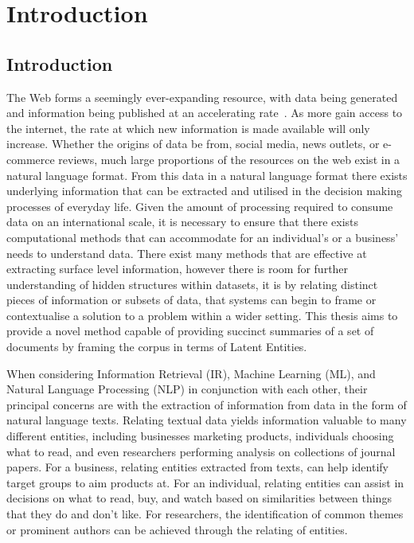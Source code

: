 \documentclass[10pt]{report}
\begin{document}
\renewcommand{\baselinestretch}{0.5}\normalsize
\tableofcontents
\listoffigures
\listoftables
\renewcommand{\baselinestretch}{2.0}\normalsize

%
%
%
%

\chapter{Introduction}

\section{Introduction}
The Web forms a seemingly ever-expanding resource, with data being generated and information being published at an accelerating rate~\cite{WebServer-lc}. As more gain access to the internet, the rate at which new information is made available will only increase. Whether the origins of data be from, social media, news outlets, or e-commerce reviews, much large proportions of the resources on the web exist in a natural language format. From this data in a natural language format there exists underlying information that can be extracted and utilised in the decision making processes of everyday life. Given the amount of processing required to consume data on an international scale, it is necessary to ensure that there exists computational methods that can accommodate for an individual's or a business' needs to understand data. There exist many methods that are effective at extracting surface level information, however there is room for further understanding of hidden structures within datasets, it is by relating distinct pieces of information or subsets of data, that systems can begin to frame or contextualise a solution to a problem within a wider setting. This thesis aims to provide a novel method capable of providing succinct summaries of a set of documents by framing the corpus in terms of Latent Entities.

When considering Information Retrieval (IR), Machine Learning (ML), and Natural Language Processing (NLP) in conjunction with each other, their principal concerns are with the extraction of information from data in the form of natural language texts. Relating textual data yields information valuable to many different entities, including businesses marketing products, individuals choosing what to read, and even researchers performing analysis on collections of journal papers. For a business, relating entities extracted from texts, can help identify target groups to aim products at. For an individual, relating entities can assist in decisions on what to read, buy, and watch based on similarities between things that they do and don’t like. For researchers, the identification of common themes or prominent authors can be achieved through the relating of entities.
\end{document}
